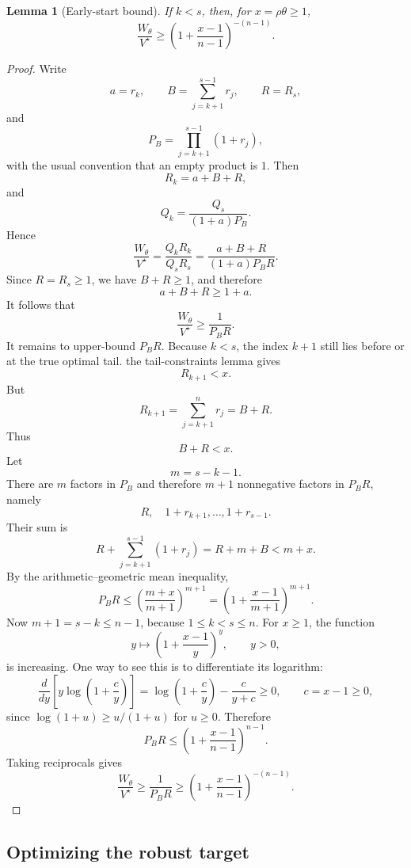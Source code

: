 \documentclass[11pt,a4paper]{article}
\newtheorem{lemma}{Lemma}
\begin{document}
\begin{lemma}[Early-start bound]
\label{lem:early}
If \(k<s\), then, for \(x=\rho\theta\ge1\),
\[
  \frac{W_\theta}{V^\star}
  \ge
  \left(1+\frac{x-1}{n-1}\right)^{-(n-1)}.
\]
\end{lemma}

\begin{proof}
Write
\[
  a=r_k,
  \qquad
  B=\sum_{j=k+1}^{s-1}r_j,
  \qquad
  R=R_s,
\]
and
\[
  P_B=\prod_{j=k+1}^{s-1}(1+r_j),
\]
with the usual convention that an empty product is \(1\).  Then
\[
  R_k=a+B+R,
\]
and
\[
  Q_k=\frac{Q_s}{(1+a)P_B}.
\]
Hence
\[
  \frac{W_\theta}{V^\star}
  =
  \frac{Q_kR_k}{Q_sR_s}
  =
  \frac{a+B+R}{(1+a)P_BR}.
\]
Since \(R=R_s\ge1\), we have \(B+R\ge1\), and therefore
\[
  a+B+R\ge1+a.
\]
It follows that
\[
  \frac{W_\theta}{V^\star}
  \ge
  \frac1{P_BR}.
\]
It remains to upper-bound \(P_BR\).  Because \(k<s\), the index \(k+1\) still
lies before or at the true optimal tail.  the tail-constraints lemma gives
\[
  R_{k+1}<x.
\]
But
\[
  R_{k+1}
  =\sum_{j=k+1}^n r_j
  =B+R.
\]
Thus
\[
  B+R<x.
\]
Let
\[
  m=s-k-1.
\]
There are \(m\) factors in \(P_B\) and therefore \(m+1\) nonnegative factors in
\(P_BR\), namely
\[
  R,
  \quad
  1+r_{k+1},\dots,1+r_{s-1}.
\]
Their sum is
\[
  R+\sum_{j=k+1}^{s-1}(1+r_j)
  =R+m+B
  <m+x.
\]
By the arithmetic--geometric mean inequality,
\[
  P_BR
  \le
  \left(\frac{m+x}{m+1}\right)^{m+1}
  =
  \left(1+\frac{x-1}{m+1}\right)^{m+1}.
\]
Now \(m+1=s-k\le n-1\), because \(1\le k<s\le n\).  For \(x\ge1\), the function
\[
  y\longmapsto \left(1+\frac{x-1}{y}\right)^y,
  \qquad y>0,
\]
is increasing.  One way to see this is to differentiate its logarithm:
\[
  \frac{d}{dy}\left[y\log\left(1+\frac{c}{y}\right)\right]
  =
  \log\left(1+\frac{c}{y}\right)-\frac{c}{y+c}\ge0,
  \qquad c=x-1\ge0,
\]
since \(\log(1+u)\ge u/(1+u)\) for \(u\ge0\).  Therefore
\[
  P_BR
  \le
  \left(1+\frac{x-1}{n-1}\right)^{n-1}.
\]
Taking reciprocals gives
\[
  \frac{W_\theta}{V^\star}
  \ge
  \frac1{P_BR}
  \ge
  \left(1+\frac{x-1}{n-1}\right)^{-(n-1)}.
\]
\end{proof}

\subsection{Optimizing the robust target}
\end{document}
